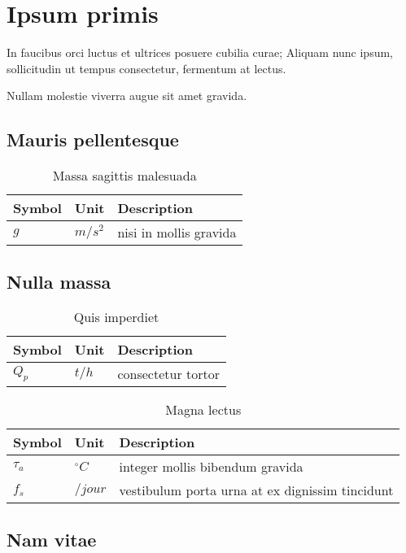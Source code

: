 \newpage 
\section{Ipsum primis}

In faucibus orci luctus et ultrices posuere cubilia curae; Aliquam nunc ipsum,
sollicitudin ut tempus consectetur, fermentum at lectus.

Nullam molestie viverra augue sit amet gravida.

\newenvironment{nomenclature}[1]
{
\begin{table}[hbt]
\caption{#1}
\begin{center}
\begin{tabular}{|l|l|l|}
\hline
\textbf{Symbol} & \textbf{Unit} & \textbf{Description}\\
\hline
}
{
\\\hline
\end{tabular}
\end{center}
\end{table}
}

\subsection{Mauris pellentesque}

\begin{nomenclature}{Massa sagittis malesuada}
$g$     & $m/s^{2}$ & nisi in mollis gravida
\end{nomenclature}

\subsection{Nulla massa}

\begin{nomenclature}{Quis imperdiet}
$Q_{p}$         & $t/h$             & consectetur tortor
\end{nomenclature}

\begin{nomenclature}{Magna lectus}
$\tau_{a}$    	& $^{\circ}C$       & integer mollis bibendum gravida\\
$f_{s}$     	& $/jour$           & vestibulum porta urna at ex dignissim tincidunt
\end{nomenclature}

\subsection{Nam vitae}

